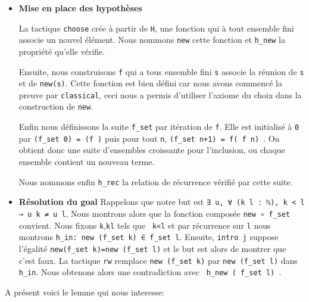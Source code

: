 \documentclass[a4paper, 12pt]{article}
\newcommand{\lean}[1]{\texttt{#1}}
\begin{document}
\begin{itemize}

    \item \textbf{Mise en place des hypothèses}
    
    La tactique \lean{choose} crée à partir de \lean{H}, une fonction qui à tout ensemble fini associe un nouvel élément. Nous nommons \lean{new} cette fonction et \lean{h_new} la
    propriété qu'elle vérifie.
    
    Ensuite, nous construisons \lean{f} qui a tous ensemble fini \lean{s} associe la réunion de \lean{s} et de \lean{{new(s)}}. Cette fonction est bien défini car nous avons commencé la
    preuve par \lean{classical}, ceci nous a permis d'utiliser l'axiome du choix dans la construction de \lean{new}.
    
    Enfin nous définissons la suite \lean{f_set} par itération de \lean{f}. Elle est initialisé à \lean{0} par \lean{(f_set 0) = (f \empty)}
    puis pour tout \lean{n}, \lean{(f_set n+1) = f( f n) }. On obtient donc une suite d'ensembles croissante pour l'inclusion, ou chaque ensemble
    contient un nouveau terme. 
    
    Nous nommons enfin \lean{h_rec} la relation de récurrence vérifié par cette suite.
    

    \item \textbf{Résolution du goal }
    Rappelons que notre but est \lean{∃ u, ∀ (k l : ℕ), k < l → u k ≠ u l}, Nous montrons alors que la fonction composée \lean{new ∘ f_set} convient. Nous fixons \lean{k},\lean{kl}
    tels que \lean{ k<l}  et par récurrence sur \lean{l} nous montrons \lean{h_in: new (f_set k) ∈ f_set l}. Ensuite, \lean{intro j} suppose l'égalité \lean{new(f_set k)=new (f_set l)}
    et le but est alors de montrer que c'est faux. La tactique \lean{rw} remplace \lean{new (f_set k)} par \lean{new (f_set l)} dans \lean{h_in}. Nous obtenons alors une contradiction
    avec \lean{ h_new ( f_set l) }.


\end{itemize}

\vspace{}

A présent voici le lemme qui nous interesse:
\end{document}
